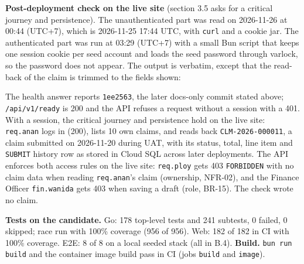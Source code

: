 \textbf{Post-deployment check on the live site} (section 3.5 asks for a critical journey and persistence). The unauthenticated part was read on 2026-11-26 at 00:44 (UTC+7), which is 2026-11-25 17:44 UTC, with \texttt{curl} and a cookie jar. The authenticated part was run at 03:29 (UTC+7) with a small Bun script that keeps one session cookie per seed account and loads the seed password through varlock, so the password does not appear. The output is verbatim, except that the read-back of the claim is trimmed to the fields shown:


The health answer reports \texttt{1ee2563}, the later docs-only commit stated above; \texttt{/api/v1/ready} is 200 and the API refuses a request without a session with a 401. With a session, the critical journey and persistence hold on the live site: \texttt{req.anan} logs in (200), lists 10 own claims, and reads back \texttt{CLM-2026-000011}, a claim submitted on 2026-11-20 during UAT, with its status, total, line item and \texttt{SUBMIT} history row as stored in Cloud SQL across later deployments. The API enforces both access rules on the live site: \texttt{req.ploy} gets 403 \texttt{FORBIDDEN} with no claim data when reading \texttt{req.anan}'s claim (ownership, NFR-02), and the Finance Officer \texttt{fin.wanida} gets 403 when saving a draft (role, BR-15). The check wrote no claim.

\textbf{Tests on the candidate.} Go: 178 top-level tests and 241 subtests, 0 failed, 0 skipped; race run with 100\% coverage (956 of 956). Web: 182 of 182 in CI with 100\% coverage. E2E: 8 of 8 on a local seeded stack (all in B.4).
\textbf{Build.} \texttt{bun run build} and the container image build pass in CI (jobs \texttt{build} and \texttt{image}).
